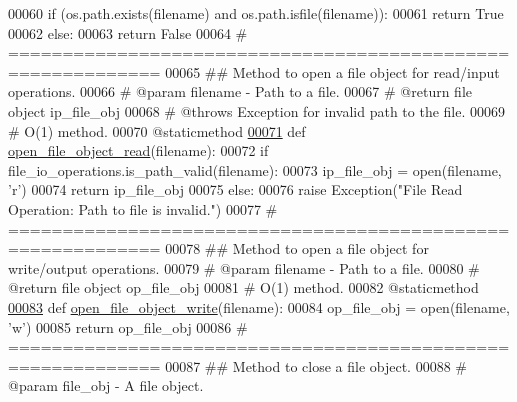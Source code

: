 \begin{DoxyCode}
00060         \textcolor{keywordflow}{if} (os.path.exists(filename) \textcolor{keywordflow}{and} os.path.isfile(filename)):
00061             \textcolor{keywordflow}{return} \textcolor{keyword}{True}
00062         \textcolor{keywordflow}{else}:
00063             \textcolor{keywordflow}{return} \textcolor{keyword}{False}
00064     \textcolor{comment}{# ============================================================}
00065     \textcolor{comment}{##  Method to open a file object for read/input operations.}
00066     \textcolor{comment}{#   @param filename - Path to a file.}
00067     \textcolor{comment}{#   @return file object ip\_file\_obj}
00068     \textcolor{comment}{#   @throws Exception for invalid path to the file.}
00069     \textcolor{comment}{#   O(1) method.}
00070     @staticmethod
\hypertarget{file__io_8py_source_l00071}{}\hyperlink{classutilities_1_1file__io_1_1file__io__operations_a1a7ef324955033ad370338fe37e68194}{00071}     \textcolor{keyword}{def }\hyperlink{classutilities_1_1file__io_1_1file__io__operations_a1a7ef324955033ad370338fe37e68194}{open\_file\_object\_read}(filename):
00072         \textcolor{keywordflow}{if} file\_io\_operations.is\_path\_valid(filename):
00073             ip\_file\_obj = open(filename, \textcolor{stringliteral}{'}\textcolor{stringliteral}{r')}
00074 \textcolor{stringliteral}{            }\textcolor{keywordflow}{return} ip\_file\_obj
00075         \textcolor{keywordflow}{else}:
00076             \textcolor{keywordflow}{raise} Exception(\textcolor{stringliteral}{"File Read Operation: Path to file is invalid."})
00077     \textcolor{comment}{# ============================================================}
00078     \textcolor{comment}{##  Method to open a file object for write/output operations.}
00079     \textcolor{comment}{#   @param filename - Path to a file.}
00080     \textcolor{comment}{#   @return file object op\_file\_obj}
00081     \textcolor{comment}{#   O(1) method.}
00082     @staticmethod
\hypertarget{file__io_8py_source_l00083}{}\hyperlink{classutilities_1_1file__io_1_1file__io__operations_aaf94e26da1d988ece479d1600ad1de4a}{00083}     \textcolor{keyword}{def }\hyperlink{classutilities_1_1file__io_1_1file__io__operations_aaf94e26da1d988ece479d1600ad1de4a}{open\_file\_object\_write}(filename):
00084         op\_file\_obj = open(filename, \textcolor{stringliteral}{'w'})
00085         \textcolor{keywordflow}{return} op\_file\_obj
00086     \textcolor{comment}{# ============================================================}
00087     \textcolor{comment}{##  Method to close a file object.}
00088     \textcolor{comment}{#   @param file\_obj - A file object.}

\end{DoxyCode}
